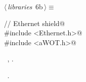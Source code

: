 \documentclass[a4paper, 12pt]{article}
\begin{document}
\begin{flushleft} \small
\begin{minipage}{\linewidth}\label{scrap7}\raggedright\small
{}$\langle\,${\itshape libraries}\nobreak\ {\footnotesize{6b}}$\,\rangle\equiv$
\vspace{-1ex}
\begin{list}{}{\setlength{\leftmargin}{1em}} \item
\mbox{}\lstinline@// Ethernet shield@\\
\mbox{}\lstinline@#include <Ethernet.h>@\\
\mbox{}\lstinline@#include <aWOT.h>@\\
\mbox{}{\NWsep}
\end{list}
\vspace{-1ex}
\vspace{-1ex}
\footnotesize
\begin{list}{}{\setlength{\itemsep}{-\parsep}\setlength{\itemindent}{-\leftmargin}}
\item \NWtxtMacroDefBy\ , .
\item \NWtxtMacroRefIn\ .
\end{list}
\end{minipage}
\end{flushleft}
\end{document}
